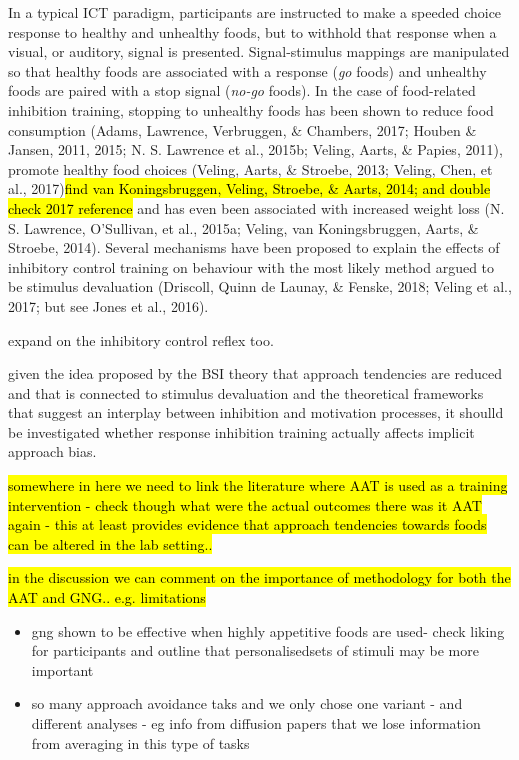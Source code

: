 \documentclass[man,floatsintext]{apa6}
\providecommand{\tightlist}{%
  \setlength{\itemsep}{0pt}\setlength{\parskip}{0pt}}
\begin{document}
In a typical ICT paradigm, participants are instructed to make a speeded choice response to healthy and unhealthy foods, but to withhold that response when a visual, or auditory, signal is presented. Signal-stimulus mappings are manipulated so that healthy foods are associated with a response (\textit{go} foods) and unhealthy foods are paired with a stop signal (\textit{no-go} foods). In the case of food-related inhibition training, stopping to unhealthy foods has been shown to reduce food consumption (Adams, Lawrence, Verbruggen, \& Chambers, 2017; Houben \& Jansen, 2011, 2015; N. S. Lawrence et al., 2015b; Veling, Aarts, \& Papies, 2011), promote healthy food choices (Veling, Aarts, \& Stroebe, 2013; Veling, Chen, et al., 2017)\hl{find van Koningsbruggen, Veling, Stroebe, \& Aarts, 2014; and double check 2017 reference} and has even been associated with increased weight loss (N. S. Lawrence, O'Sullivan, et al., 2015a; Veling, van Koningsbruggen, Aarts, \& Stroebe, 2014). Several mechanisms have been proposed to explain the effects of inhibitory control training on behaviour with the most likely method argued to be stimulus devaluation (Driscoll, Quinn de Launay, \& Fenske, 2018; Veling et al., 2017; but see Jones et al., 2016).

expand on the inhibitory control reflex too.

given the idea proposed by the BSI theory that approach tendencies are reduced and that is connected to stimulus devaluation and the theoretical frameworks that suggest an interplay between inhibition and motivation processes, it shoulld be investigated whether response inhibition training actually affects implicit approach bias.

\hl{somewhere in here we need to link the literature where AAT is used as a training intervention - check though what were the actual outcomes there was it AAT again - this at least provides evidence that approach tendencies towards foods can be altered in the lab setting..}

\hl{in the discussion we can comment on the importance of methodology for both the AAT and GNG.. e.g. limitations}

\begin{itemize}
\tightlist
\item
  gng shown to be effective when highly appetitive foods are used- check liking for participants and outline that personalisedsets of stimuli may be more important
\item
  so many approach avoidance taks and we only chose one variant - and different analyses - eg info from diffusion papers that we lose information from averaging in this type of tasks
\end{itemize}
\end{document}
